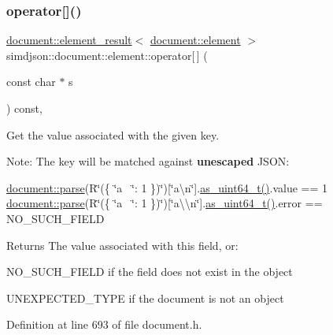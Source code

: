 \subsubsection{\texorpdfstring{operator[]()}{operator[]()}\hspace{0.1cm}{\footnotesize\ttfamily [2/2]}}
{\footnotesize\ttfamily \hyperlink{classsimdjson_1_1document_1_1element__result}{document\+::element\+\_\+result}$<$ \hyperlink{classsimdjson_1_1document_1_1element}{document\+::element} $>$ simdjson\+::document\+::element\+::operator\mbox{[}$\,$\mbox{]} (\begin{DoxyParamCaption}\item[{const char $\ast$}]{s }\end{DoxyParamCaption}) const\hspace{0.3cm}{\ttfamily [inline]}, {\ttfamily [noexcept]}}



Get the value associated with the given key. 

Note\+: The key will be matched against {\bfseries unescaped} J\+S\+ON\+:

\hyperlink{classsimdjson_1_1document_a6f11cda7c4a06fffdc00fdc97d98ae2b}{document\+::parse}(R\char`\"{}(\{ \char`\"{}a~\newline
\char`\"{}\+: 1 \})\char`\"{})\mbox{[}\char`\"{}a\textbackslash{}n\char`\"{}\mbox{]}.\hyperlink{classsimdjson_1_1document_1_1element_ab89d449ae4c78aced06643d7323cbdfb}{as\+\_\+uint64\+\_\+t()}.value == 1 \hyperlink{classsimdjson_1_1document_a6f11cda7c4a06fffdc00fdc97d98ae2b}{document\+::parse}(R\char`\"{}(\{ \char`\"{}a~\newline
\char`\"{}\+: 1 \})\char`\"{})\mbox{[}\char`\"{}a\textbackslash{}\textbackslash{}n\char`\"{}\mbox{]}.\hyperlink{classsimdjson_1_1document_1_1element_ab89d449ae4c78aced06643d7323cbdfb}{as\+\_\+uint64\+\_\+t()}.error == N\+O\+\_\+\+S\+U\+C\+H\+\_\+\+F\+I\+E\+LD

\begin{DoxyReturn}{Returns}
The value associated with this field, or\+:
\begin{DoxyItemize}
\item N\+O\+\_\+\+S\+U\+C\+H\+\_\+\+F\+I\+E\+LD if the field does not exist in the object
\item U\+N\+E\+X\+P\+E\+C\+T\+E\+D\+\_\+\+T\+Y\+PE if the document is not an object 
\end{DoxyItemize}
\end{DoxyReturn}


Definition at line 693 of file document.\+h.



